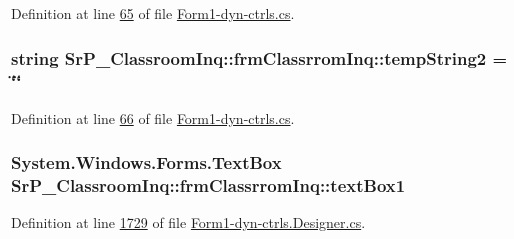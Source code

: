 \-Definition at line \hyperlink{_form1-dyn-ctrls_8cs_source_l00065}{65} of file \hyperlink{_form1-dyn-ctrls_8cs_source}{\-Form1-\/dyn-\/ctrls.\-cs}.

\hypertarget{class_sr_p___classroom_inq_1_1frm_classrrom_inq_a4ebaa0f6e4e9f61300c6aae855fc8fc1}{
\subsubsection[{temp\-String2}]{\setlength{\rightskip}{0pt plus 5cm}string {\bf \-Sr\-P\-\_\-\-Classroom\-Inq\-::frm\-Classrrom\-Inq\-::temp\-String2} = \char`\"{}\char`\"{}}}
\label{class_sr_p___classroom_inq_1_1frm_classrrom_inq_a4ebaa0f6e4e9f61300c6aae855fc8fc1}


\-Definition at line \hyperlink{_form1-dyn-ctrls_8cs_source_l00066}{66} of file \hyperlink{_form1-dyn-ctrls_8cs_source}{\-Form1-\/dyn-\/ctrls.\-cs}.

\hypertarget{class_sr_p___classroom_inq_1_1frm_classrrom_inq_a3ee11679c61cc3228121b7fe4f51d0c8}{
\subsubsection[{text\-Box1}]{\setlength{\rightskip}{0pt plus 5cm}\-System.\-Windows.\-Forms.\-Text\-Box {\bf \-Sr\-P\-\_\-\-Classroom\-Inq\-::frm\-Classrrom\-Inq\-::text\-Box1}}}
\label{class_sr_p___classroom_inq_1_1frm_classrrom_inq_a3ee11679c61cc3228121b7fe4f51d0c8}


\-Definition at line \hyperlink{_form1-dyn-ctrls_8_designer_8cs_source_l01729}{1729} of file \hyperlink{_form1-dyn-ctrls_8_designer_8cs_source}{\-Form1-\/dyn-\/ctrls.\-Designer.\-cs}.

